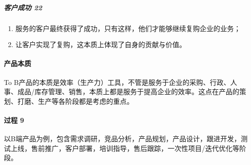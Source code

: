\documentclass[letterpaper,11pt,english]{sphinxmanual}
\begin{document}
\subparagraph{客户成功 22\sphinxfootnotemark[47]}
\label{\detokenize{chapter_introduction/2B:id3}}%
\begin{footnotetext}[47]\sphinxAtStartFootnote
{}
%
\end{footnotetext}\ignorespaces \begin{enumerate}
%
\item {} 
服务的客户最终获得了成功，只有这样，他们才能够继续复购企业的业务；

\item {} 
让客户实现了复购，这本质上体现了自身的贡献与价值。

\end{enumerate}


\paragraph{产品本质}
\label{\detokenize{chapter_introduction/2B:id4}}
To
B产品的本质是效率（生产力）工具，不管是服务于企业的采购、行政、人事、成品/库存管理、销售，本质上都是服务于提高企业的效率。这点在产品的策划、打磨、生产等各阶段都是考虑的重点。


\paragraph{过程 9\sphinxfootnotemark[48]}
\label{\detokenize{chapter_introduction/2B:id5}}%
\begin{footnotetext}[48]\sphinxAtStartFootnote
{}
%
\end{footnotetext}\ignorespaces 
以B端产品为例，包含需求调研，竞品分析，产品规划，产品设计，跟进开发，测试上线，售前推广，客户部署，培训指导，售后跟踪，一次性项目/迭代优化等阶段。
\end{document}
